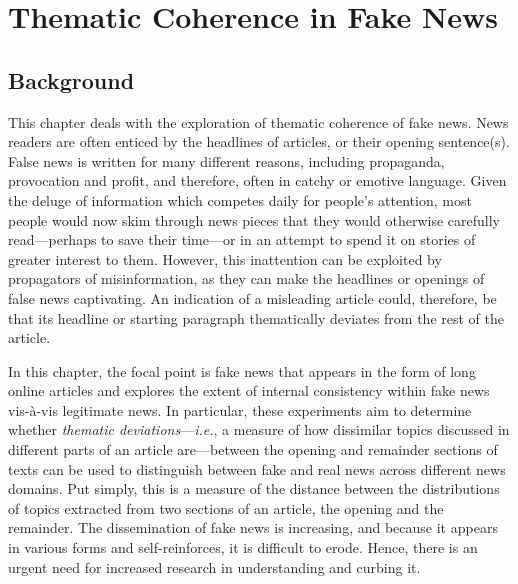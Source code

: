 \chapter{Thematic Coherence in Fake News}\label{ch:thematic-coherence}

\setcounter{hyp}{-1}

\section{Background}
\label{sec:4-background}

This chapter deals with the exploration of thematic coherence of fake news. News readers are often enticed by the headlines of articles, or their opening sentence(s). False news is written for many different reasons, including propaganda, provocation and profit, and therefore, often in catchy or emotive language. Given the deluge of information which competes daily for people's attention, most people would now skim through news pieces that they would otherwise carefully read—perhaps to save their time—or in an attempt to spend it on stories of greater interest to them. However, this inattention can be exploited by propagators of misinformation, as they can make the headlines or openings of false news captivating. An indication of a misleading article could, therefore, be that its headline or starting paragraph thematically deviates from the rest of the article.

In this chapter, the focal point is fake news that appears in the form of long online articles and explores the extent of internal consistency within fake news vis-à-vis legitimate news. In particular, these experiments aim to determine whether \emph{thematic deviations}—\emph{i.e.}, a measure of how dissimilar topics discussed in different parts of an article are—between the opening and remainder sections of texts can be used to distinguish between fake and real news across different news domains. Put simply, this is a measure of the distance between the distributions of topics extracted from two sections of an article, the opening and the remainder. The dissemination of fake news is increasing, and because it appears in various forms and self-reinforces, it is difficult to erode. Hence, there is an urgent need for increased research in understanding and curbing it.

